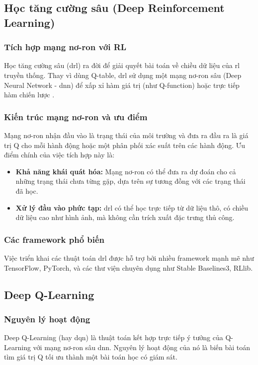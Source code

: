 \begin{enumerate}
\subsection{Học tăng cường sâu (Deep Reinforcement Learning)}
\subsubsection{Tích hợp mạng nơ-ron với RL}
Học tăng cường sâu (\ac{drl}) ra đời để giải quyết bài toán về chiều dữ liệu của
\ac{rl} truyền thống. Thay vì dùng Q-table, \ac{drl} sử dụng một mạng nơ-ron sâu
(Deep Neural Network - \ac{dnn}) để xấp xỉ hàm giá trị (như Q-function) hoặc trực
tiếp hàm chiến lược \cite{Mnih2015}.

\subsubsection{Kiến trúc mạng nơ-ron và ưu điểm}
Mạng nơ-ron nhận đầu vào là trạng thái của môi trường và đưa ra đầu ra là giá trị
Q cho mỗi hành động hoặc một phân phối xác suất trên các hành động. Ưu điểm
chính của việc tích hợp này là:
\begin{itemize}
    \item \textbf{Khả năng khái quát hóa:} Mạng nơ-ron có thể đưa ra dự đoán cho
        cả những trạng thái chưa từng gặp, dựa trên sự tương đồng với các trạng thái
        đã học.

    \item \textbf{Xử lý đầu vào phức tạp:} \ac{drl} có thể học trực tiếp từ dữ liệu
        thô, có chiều dữ liệu cao như hình ảnh, mà không cần trích xuất đặc trưng
        thủ công.
\end{itemize}

\subsubsection{Các framework phổ biến}
Việc triển khai các thuật toán \ac{drl} được hỗ trợ bởi nhiều framework mạnh mẽ như
TensorFlow, PyTorch, và các thư viện chuyên dụng như Stable Baselines3, RLlib.

\subsection{Deep Q-Learning}
\subsubsection{Nguyên lý hoạt động}
Deep Q-Learning (hay \ac{dqn}) là thuật toán kết hợp trực tiếp ý tưởng của Q-Learning
với mạng nơ-ron sâu \ac{dnn}. Nguyên lý hoạt động của nó là biến bài toán tìm giá
trị Q tối ưu thành một bài toán học có giám sát.


\end{enumerate}
